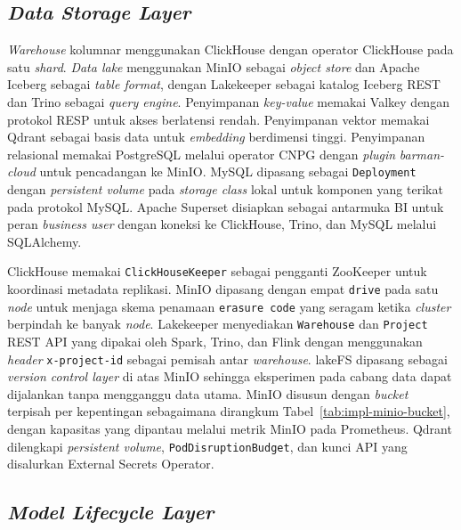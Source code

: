 \subsection{\textit{Data Storage Layer}}
\label{subsec:impl-penyimpanan}

\textit{Warehouse} kolumnar menggunakan ClickHouse \autocite{clickhouse2024} dengan operator ClickHouse pada satu \textit{shard}. \textit{Data lake} menggunakan MinIO sebagai \textit{object store} dan Apache Iceberg sebagai \textit{table format}, dengan Lakekeeper \autocite{lakekeeper2025} sebagai katalog Iceberg REST dan Trino \autocite{trino2024} sebagai \textit{query engine}. Penyimpanan \textit{key-value} memakai Valkey \autocite{valkey2025} dengan protokol RESP untuk akses berlatensi rendah. Penyimpanan vektor memakai Qdrant \autocite{qdrant2025} sebagai basis data untuk \textit{embedding} berdimensi tinggi. Penyimpanan relasional memakai PostgreSQL melalui operator CNPG dengan \textit{plugin} \textit{barman-cloud} untuk pencadangan ke MinIO. MySQL dipasang sebagai \texttt{Deployment} dengan \textit{persistent volume} pada \textit{storage class} lokal untuk komponen yang terikat pada protokol MySQL. Apache Superset \autocite{superset2025} disiapkan sebagai antarmuka BI untuk peran \textit{business user} dengan koneksi ke ClickHouse, Trino, dan MySQL melalui SQLAlchemy.

ClickHouse memakai \texttt{ClickHouseKeeper} sebagai pengganti ZooKeeper untuk koordinasi metadata replikasi. MinIO dipasang dengan empat \texttt{drive} pada satu \textit{node} untuk menjaga skema penamaan \texttt{erasure code} yang seragam ketika \textit{cluster} berpindah ke banyak \textit{node}. Lakekeeper menyediakan \texttt{Warehouse} dan \texttt{Project} REST API yang dipakai oleh Spark, Trino, dan Flink dengan menggunakan \textit{header} \texttt{x-project-id} sebagai pemisah antar \textit{warehouse}. lakeFS \autocite{lakefs2025} dipasang sebagai \textit{version control layer} di atas MinIO sehingga eksperimen pada cabang data dapat dijalankan tanpa mengganggu data utama. MinIO disusun dengan \textit{bucket} terpisah per kepentingan sebagaimana dirangkum Tabel~\ref{tab:impl-minio-bucket}, dengan kapasitas yang dipantau melalui metrik MinIO pada Prometheus. Qdrant dilengkapi \textit{persistent volume}, \texttt{PodDisruptionBudget}, dan kunci API yang disalurkan External Secrets Operator.



\subsection{\textit{Model Lifecycle Layer}}
\label{subsec:impl-model}

